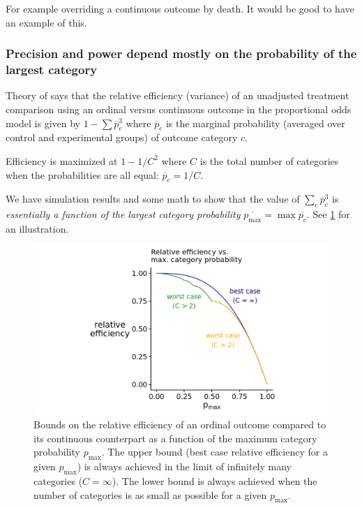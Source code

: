 \documentclass[
  11pt,
  fleqn
]{article}
\begin{document}
For example overriding a continuous outcome by death. It would be
good to have an example of this.

\subsubsection{Precision and power depend mostly on the probability of the
largest category}

Theory of \citep{whiteheadSampleSizeCalculations1993} says that the relative
efficiency (variance) of an unadjusted treatment comparison using an ordinal
versus continuous outcome in the proportional odds model is given by $1 - \sum
\overline p_c^3$ where $\overline p_c$ is the marginal probability (averaged
over control and experimental groups) of outcome category $c$.

Efficiency is maximized at $1 - 1/C^2$ where $C$ is the total number of
categories when the probabilities are all equal: $\overline p_c = 1/C$.

We have simulation results and some math to show that the value of $\sum_c
\overline p_c^3$ is \emph{essentially a function of the largest category
probability} $\overline{p_{\max}} = \max \overline{p_c}$. See \ref{fig:p_max}
for an illustration.

\begin{figure}
  \includegraphics[width=6in]{p_max_controls_efficiency.png}
  \caption{Bounds on the relative efficiency of an ordinal outcome
    compared to its continuous counterpart as a function of the maximum
    category probability $p_\text{max}$. The upper bound (best case
    relative efficiency for a given $p_\text{max}$) is always achieved in the
    limit of infinitely many categories ($C = \infty$). The lower bound
    is always achieved when the number of categories is as small as
  possible for a given $p_\text{max}$.}
  \label{fig:p_max}
\end{figure}
\end{document}

